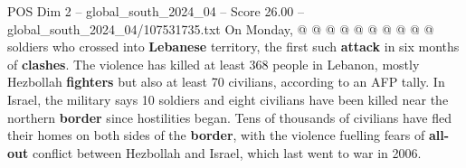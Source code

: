 \begin{textsample}{POS Dim 2 – global\_south\_2024\_04 – Score 26.00 – global\_south\_2024\_04/107531735.txt}
On Monday, @ @ @ @ @ @ @ @ @ @ soldiers who crossed into \textbf{Lebanese} territory, the first such \textbf{attack} in six months of \textbf{clashes}.
The violence has killed at least 368 people in Lebanon, mostly Hezbollah \textbf{fighters} but also at least 70 civilians, according to an AFP tally.
In Israel, the military says 10 soldiers and eight civilians have been killed near the northern \textbf{border} since hostilities began.
Tens of thousands of civilians have fled their homes on both sides of the \textbf{border}, with the violence fuelling fears of \textbf{all-out} conflict between Hezbollah and Israel, which last went to war in 2006.

\end{textsample}
